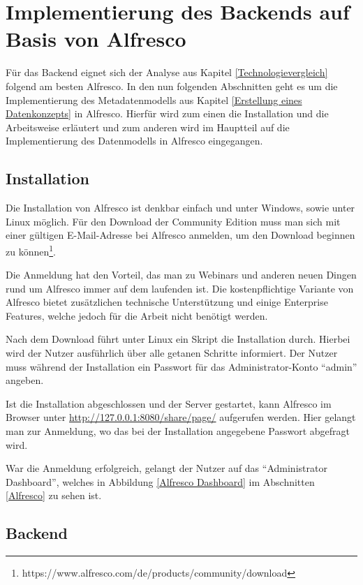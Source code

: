 \section{Implementierung des Backends auf Basis von Alfresco} \label{Implementierung Backend}
F\"ur das Backend eignet sich der Analyse aus Kapitel \ref{Technologievergleich} folgend am besten Alfresco. In den nun folgenden Abschnitten geht es um die Implementierung des Metadatenmodells aus Kapitel \ref{Erstellung eines Datenkonzepts} in Alfresco. Hierf\"ur wird zum einen die Installation und die Arbeitsweise erl\"autert und zum anderen wird im Hauptteil auf die Implementierung des Datenmodells in Alfresco eingegangen.

\subsection{Installation}
Die Installation von Alfresco ist denkbar einfach und unter Windows, sowie unter Linux m\"oglich. F\"ur den Download der Community Edition muss man sich mit einer g\"ultigen E-Mail-Adresse bei Alfresco anmelden, um den Download beginnen zu k\"onnen\footnote{https://www.alfresco.com/de/products/community/download}. 

Die Anmeldung hat den Vorteil, das man zu Webinars und anderen neuen Dingen rund um Alfresco immer auf dem laufenden ist.
Die kostenpflichtige Variante von Alfresco bietet zus\"atzlichen technische Unterst\"utzung und einige Enterprise Features, welche jedoch f\"ur die Arbeit nicht ben\"otigt werden. \cite{Wiki_Alfresco}

Nach dem Download f\"uhrt unter Linux ein Skript die Installation durch. Hierbei wird der Nutzer ausf\"uhrlich \"uber alle getanen Schritte informiert. Der Nutzer muss w\"ahrend der Installation ein Passwort f\"ur das Administrator-Konto "`admin"' angeben.\cite{Alfresco_und_Liferay}

Ist die Installation abgeschlossen und der Server gestartet, kann Alfresco im Browser unter \url{http://127.0.0.1:8080/share/page/} aufgerufen werden. Hier gelangt man zur Anmeldung, wo das bei der Installation angegebene Passwort abgefragt wird.

War die Anmeldung erfolgreich, gelangt der Nutzer auf das "`Administrator Dashboard"', welches in Abbildung \ref{Alfresco Dashboard} im Abschnitten \ref{Alfresco} zu sehen ist.

\subsection{Backend}